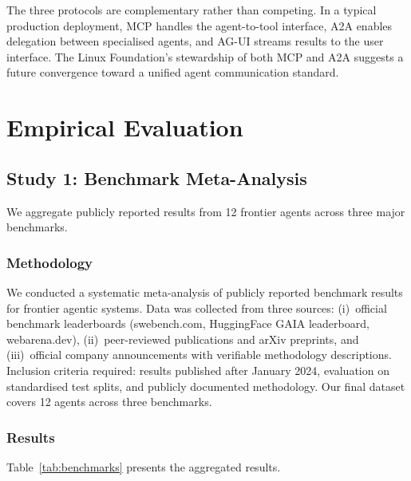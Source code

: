 \documentclass[12pt, a4paper]{article}
\begin{document}
The three protocols are complementary rather than competing. In a typical production deployment, MCP handles the agent-to-tool interface, A2A enables delegation between specialised agents, and AG-UI streams results to the user interface. The Linux Foundation's stewardship of both MCP and A2A suggests a future convergence toward a unified agent communication standard.

\section{Empirical Evaluation}\label{sec:evaluation}

\subsection{Study 1: Benchmark Meta-Analysis}
We aggregate publicly reported results from 12 frontier agents across three major benchmarks.

\subsubsection{Methodology}
We conducted a systematic meta-analysis of publicly reported benchmark results for frontier agentic systems. Data was collected from three sources: (i)~official benchmark leaderboards (swebench.com, HuggingFace GAIA leaderboard, webarena.dev), (ii)~peer-reviewed publications and arXiv preprints, and (iii)~official company announcements with verifiable methodology descriptions. Inclusion criteria required: results published after January 2024, evaluation on standardised test splits, and publicly documented methodology. Our final dataset covers 12 agents across three benchmarks.

\subsubsection{Results}
Table~\ref{tab:benchmarks} presents the aggregated results.
\end{document}
